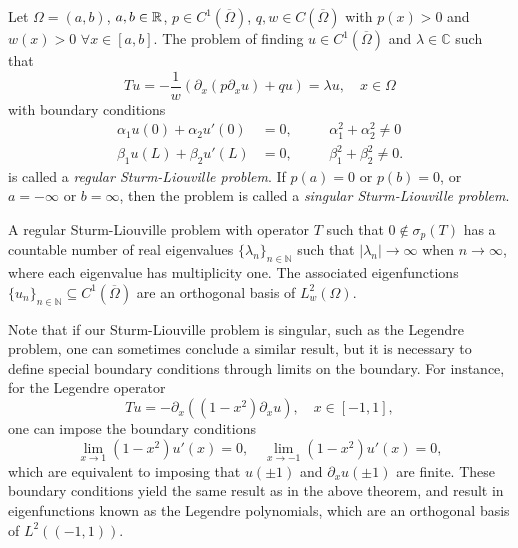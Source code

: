 \begin{definition}\label{def:regular-sturm-liouville}
    Let $\Omega = (a,b)$, $a,b\in\mathbb{R}$, $p\in C^1(\overline{\Omega})$, $q,w\in C(\overline{\Omega})$  with $p(x)>0$ and $w(x)>0$ $\forall x\in[a,b]$. The problem of finding $u\in C^1(\overline{\Omega})$ and $\lambda\in\mathbb{C}$ such that 
    \begin{equation}\label{eq:regular-sturm-liouville-operator}
        Tu = -\frac{1}{w}(\partial_x(p\partial_x u) + qu) = \lambda u,\quad x\in\Omega
    \end{equation}
    with boundary conditions
    \begin{equation}\label{eq:regular-sturm-liouville-bcs}
        \begin{aligned}
            \alpha_1 u(0) + \alpha_2 u'(0)&=0, &&\quad \alpha_1^2 + \alpha_2^2 \neq 0\\
            \beta_1 u(L) + \beta_2 u'(L)&=0, &&\quad \beta_1^2 + \beta_2^2 \neq 0.
        \end{aligned}
    \end{equation}
    is called a \emph{regular Sturm-Liouville problem}. If $p(a)=0$ or $p(b)=0$, or $a=-\infty$ or $b=\infty$, then the problem is called a \emph{singular Sturm-Liouville problem}.
\end{definition}
\begin{theorem}\label{thm:sturm-liouville-eigenfunctions}
    A regular Sturm-Liouville problem with operator $T$ such that $0\notin \sigma_p(T)$ has a countable number of real eigenvalues $\{\lambda_n\}_{n\in\mathbb N}$ such that $|\lambda_n|\to\infty$ when $n\to\infty$, where each eigenvalue has multiplicity one. The associated eigenfunctions $\{u_n\}_{n\in\mathbb N}\subseteq C^1(\overline{\Omega})$ are an orthogonal basis of $L^2_w(\Omega)$. 
\end{theorem}

Note that if our Sturm-Liouville problem is singular, such as the Legendre problem, one can sometimes conclude a similar result, but it is necessary to define special boundary conditions through limits on the boundary. For instance, for the Legendre operator 
\begin{equation*}
    Tu = -\partial_x ((1-x^2)\partial_x u),\quad x\in[-1,1],
\end{equation*}
one can impose the boundary conditions 
\begin{equation*}
    \lim_{x\to 1}(1-x^2)u'(x)=0,\quad \lim_{x\to -1}(1-x^2)u'(x)=0,
\end{equation*}
which are equivalent to imposing that $u(\pm 1)$ and $\partial_x u(\pm 1)$ are finite. These boundary conditions yield the same result as in the above theorem, and result in  eigenfunctions known as the Legendre polynomials, which are an orthogonal basis of $L^2((-1,1))$. 

